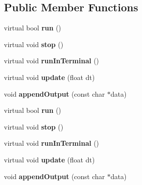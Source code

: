 \subsection*{Public Member Functions}
\begin{DoxyCompactItemize}
\item 
\mbox{\label{classPlayerTaskMac_ad21ab4ee26b1705306331b4a0ef66a44}} 
virtual bool {\bfseries run} ()
\item 
\mbox{\label{classPlayerTaskMac_adf856a5ad4f6f6166a2597021b4569ef}} 
virtual void {\bfseries stop} ()
\item 
\mbox{\label{classPlayerTaskMac_ae471869f40dcdddbadf8c69a4d87730a}} 
virtual void {\bfseries run\+In\+Terminal} ()
\item 
\mbox{\label{classPlayerTaskMac_a8b7761df9526f3d0b803194f4955e5fb}} 
virtual void {\bfseries update} (float dt)
\item 
\mbox{\label{classPlayerTaskMac_a05d061fbf33eca075646079727da7573}} 
void {\bfseries append\+Output} (const char $\ast$data)
\item 
\mbox{\label{classPlayerTaskMac_a62bf6d434849e2f60d17fca8f64e0ae5}} 
virtual bool {\bfseries run} ()
\item 
\mbox{\label{classPlayerTaskMac_a4c4066e05c96cb1c204b2563a606e771}} 
virtual void {\bfseries stop} ()
\item 
\mbox{\label{classPlayerTaskMac_a60c396cf7f6eda5285729020a0d279f0}} 
virtual void {\bfseries run\+In\+Terminal} ()
\item 
\mbox{\label{classPlayerTaskMac_a43344730765072f4527c44278b2ac645}} 
virtual void {\bfseries update} (float dt)
\item 
\mbox{\label{classPlayerTaskMac_a05d061fbf33eca075646079727da7573}} 
void {\bfseries append\+Output} (const char $\ast$data)
\end{DoxyCompactItemize}
